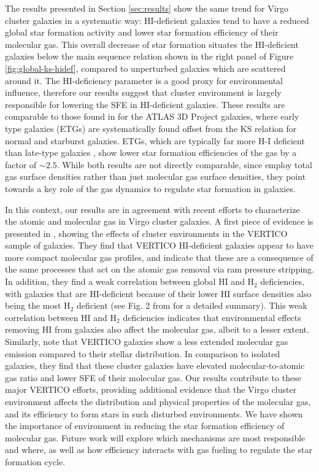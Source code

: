 \documentclass[longauth]{aa}
\begin{document}
The results presented in Section \ref{sec:results} show the same trend for Virgo cluster galaxies in a systematic way: HI-deficient galaxies tend to have a reduced global star formation activity and lower star formation efficiency of their molecular gas. This overall decrease of star formation situates the HI-deficient galaxies below the main sequence relation shown in the right panel of Figure \ref{fig:global-ks-hidef}, compared to unperturbed galaxies which are scattered around it. The HI-deficiency parameter is a good proxy for environmental influence, therefore our results suggest that cluster environment is largely responsible for lowering the SFE in HI-deficient galaxies. These results are comparable to those found in \citet{Davis2014} for the ATLAS 3D Project galaxies, where early type galaxies (ETGs) are systematically found offset from the KS relation for normal and starburst galaxies. ETGs, which are typically far more H-I deficient than late-type galaxies \citep[e.g.,][]{Huchtmeier1989}, show lower star formation efficiencies of the gas by a factor of $\sim2.5$. While both results are not directly comparable, since \citet{Davis2014} employ total gas surface densities rather than just molecular gas surface densities, they point towards a key role of the gas dynamics to regulate star formation in galaxies.

In this context, our results are in agreement with recent efforts to characterize the atomic and molecular gas in Virgo cluster galaxies. A first piece of evidence is presented in \citet{Zabel2022}, showing the effects of cluster environments in the VERTICO sample of galaxies. They find that VERTICO HI-deficient galaxies appear to have more compact molecular gas profiles, and indicate that these are a consequence of the same processes that act on the atomic gas removal via ram pressure stripping. In addition, they find a weak correlation between global HI and H$_2$ deficiencies, with galaxies that are HI-deficient because of their lower HI surface densities also being the most H$_2$ deficient (see Fig. 2 from \citet{Zabel2022} for a detailed summary). This weak correlation between HI and H$_2$ deficiencies indicates that environmental effects removing HI from galaxies also affect the molecular gas, albeit to a lesser extent. Similarly, \citet{Villanueva2022} note that VERTICO galaxies show a less extended molecular gas emission compared to their stellar distribution. In comparison to isolated galaxies, they find that these cluster galaxies have elevated molecular-to-atomic gas ratio and lower SFE of their molecular gas. Our results contribute to these major VERTICO efforts, providing additional evidence that the Virgo cluster environment affects the distribution and physical properties of the molecular gas, and its efficiency to form stars in such disturbed environments. We have shown the importance of environment in reducing the star formation efficiency of molecular gas. Future work will explore which mechanisms are most responsible and where, as well as how efficiency interacts with gas fueling to regulate the star formation cycle.
\end{document}
